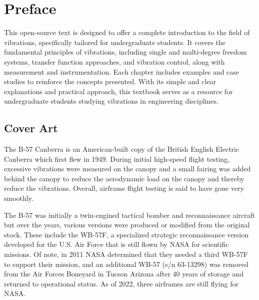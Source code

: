 \documentclass[12pt,letter]{article}
\begin{document}
\pagebreak

\setcounter{secnumdepth}{0} %

\setcounter{page}{1}



\section{Preface}
\vspace{-1ex}
This open-source text is designed to offer a complete introduction to the field of vibrations, specifically tailored for undergraduate students. It covers the fundamental principles of vibrations, including single and multi-degree freedom systems, transfer function approaches, and vibration control, along with measurement and instrumentation. Each chapter includes examples and case studies to reinforce the concepts presented. With its simple and clear explanations and practical approach, this textbook serves as a resource for undergraduate students studying vibrations in engineering disciplines.

\vspace{-1ex}
\subsection{Cover Art}
\vspace{-1ex}
The B-57 Canberra is an American-built copy of the British English Electric Canberra which first flew in 1949. During initial high-speed flight testing, excessive vibrations were measured on the canopy and a small fairing was added behind the canopy to reduce the aerodynamic load on the canopy and thereby reduce the vibrations. Overall, airframe flight testing is said to have gone very smoothly. 

The B-57 was initially a twin-engined tactical bomber and reconnaissance aircraft but over the years, various versions were produced or modified from the original stock. These include the WB-57F, a specialized strategic reconnaissance version developed for the U.S. Air Force that is still flown by NASA for scientific missions. Of note, in 2011 NASA determined that they needed a third WB-57F to support their mission, and an additional WB-57 (s/n 63-13298) was removed from the Air Forces Boneyard in Tucson Arizona after 40 years of storage and returned to operational status. As of 2022, three airframes are still flying for NASA.
\end{document}
